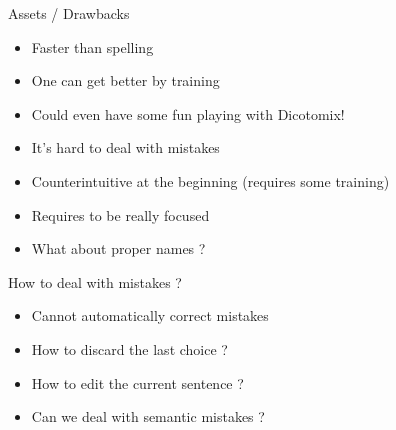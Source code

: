 \documentclass[graphics]{beamer}
\begin{document}
\begin{frame}{Assets / Drawbacks}
	\begin{tcolorbox}[colback=green!5,colframe=green!40!black,title=Assets]
		\begin{itemize}
			\item Faster than spelling
			\item One can get better by training
			\item Could even have some fun playing with Dicotomix!
		\end{itemize}
	\end{tcolorbox}
	\pause
	\begin{tcolorbox}[colback=red!5,colframe=red!40!black,title=Drawbacks]
		\begin{itemize}
			\item It's hard to deal with mistakes
			\item Counterintuitive at the beginning (requires some training)
			\item Requires to be really focused
			\item What about proper names ?
		\end{itemize}
	\end{tcolorbox}
\end{frame}

\begin{frame}{How to deal with mistakes ?}
	\begin{itemize}
		\item Cannot automatically correct mistakes
		\pause
		\item How to discard the last choice ?
		\pause
		\item How to edit the current sentence ?
		\pause
		\item Can we deal with semantic mistakes ?
	\end{itemize}
\end{frame}
\end{document}
